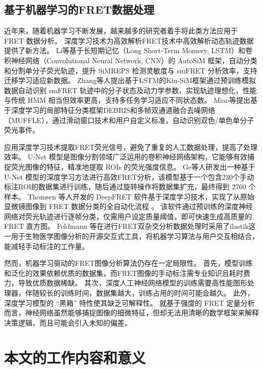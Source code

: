 \subsection{基于机器学习的FRET数据处理}
近年来，随着机器学习不断发展，越来越多的研究者着手将此类方法应用于 FRET 数据分析。
深度学习技术为高效解析FRET技术中高效解析动态轨迹数据提供了新方法。
Li等基于长短期记忆（Long Short-Term Momery, LSTM）和卷积神经网络（Convolutional Neural Network, CNN）的 AutoSiM 框架，自动分类和分割单分子荧光轨迹，提升 SiMREPS 检测灵敏度与 smFRET 分析效率，支持迁移学习适应新数据。
Zhang等人提出基于LSTM的Kin-SiM框架通过预训练模拟数据自动识别 smFRET 轨迹中的分子状态及动力学参数，实现轨迹理想化，性能与传统 HMM 相当但效率更高，支持多任务学习适应不同状态数。
Miao等提出基于深度学习的局部特征分类框架DEBRIS和多帧双通道融合去噪网络（MUFFLE），通过滑动窗口技术和用户自定义标准，自动识别双色/单色单分子荧光事件。

应用深度学习技术提取FRET荧光信号，避免了重复的人工数据处理，提高了处理效率。
U-Net 模型是图像分割领域广泛运用的卷积神经网络架构，它能够有效捕捉荧光图像的特征，精准地提取 ROIs 的荧光强度信息。
Ge等人研发出一种基于 U-Net 模型的深度学习方法进行高效FRET分析，该模型基于一个包含230个手动标注ROI的数据集进行训练，随后通过旋转操作将数据集扩充，最终得到 2760 个样本。
Thomsen 等人开发的 DeepFRET 软件基于深度学习技术，实现了从原始显微镜图像到 FRET 数据分类的全自动化流程 。
该软件通过预训练的深度神经网络对荧光轨迹进行逐帧分类，仅需用户设定质量阈值，即可快速生成高质量的 FRET 直方图。
Feldmann 等在进行FRET双杂交分析数据处理时采用了ilastik这一用于生物医学图像分析的开源交互式工具，将机器学习算法与用户交互相结合，能减轻手动标注的工作量。

然而，机器学习驱动的FRET图像分析算法仍存在一定局限性。
首先，模型训练和泛化的效果依赖优质的数据集，而FRET图像的手动标注需专业知识且耗时费力，导致优质数据稀缺。
其次，深度人工神经网络模型的训练需要高性能图形处理器，伴随较长的训练时间，数据集越大，训练占用的时间可能会越久。
此外，深度学习模型的 “黑箱” 特性使其缺乏可解释性。
就基于强度的 FRET 定量分析而言，神经网络虽然能够捕捉图像的细微特征，但却无法用清晰的数学框架来解释决策逻辑，而且可能会引入未知的偏差。

\section{本文的工作内容和意义}

